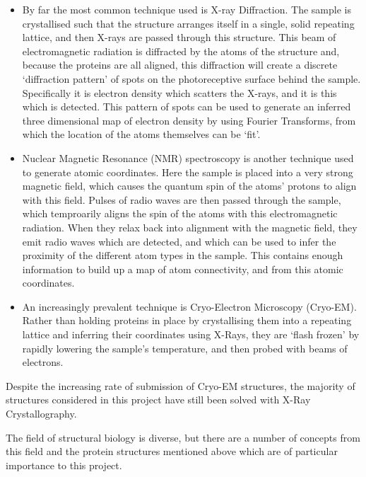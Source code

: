 \begin{itemize}

\item By far the most common technique used is X-ray Diffraction. The sample is crystallised such that the structure arranges itself in a single, solid repeating lattice, and then X-rays are passed through this structure. This beam of electromagnetic radiation is diffracted by the atoms of the structure and, because the proteins are all aligned, this diffraction will create a discrete `diffraction pattern' of spots on the photoreceptive surface behind the sample. Specifically it is electron density which scatters the X-rays, and it is this which is detected. This pattern of spots can be used to generate an inferred three dimensional map of electron density by using Fourier Transforms, from which the location of the atoms themselves can be `fit'.

\item Nuclear Magnetic Resonance (NMR) spectroscopy is another technique used to generate atomic coordinates. Here the sample is placed into a very strong magnetic field, which causes the quantum spin of the atoms' protons to align with this field. Pulses of radio waves are then passed through the sample, which temproarily aligns the spin of the atoms with this electromagnetic radiation. When they relax back into alignment with the magnetic field, they emit radio waves which are detected, and which can be used to infer the proximity of the different atom types in the sample. This contains enough information to build up a map of atom connectivity, and from this atomic coordinates.

\item An increasingly prevalent technique is Cryo-Electron Microscopy (Cryo-EM). Rather than holding proteins in place by crystallising them into a repeating lattice and inferring their coordinates using X-Rays, they are `flash frozen' by rapidly lowering the sample's temperature, and then probed with beams of electrons.

\end{itemize}

Despite the increasing rate of submission of Cryo-EM structures, the majority of structures considered in this project have still been solved with X-Ray Crystallography.

The field of structural biology is diverse, but there are a number of concepts from this field and the protein structures mentioned above which are of particular importance to this project.

